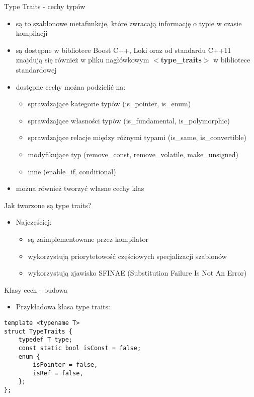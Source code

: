 \documentclass[11pt]{beamer}
\begin{document}
\begin{frame}[fragile]{Type Traits - cechy typów}
    \begin{itemize}
     \item są to szablonowe metafunkcje, które zwracają informację o typie w czasie kompilacji
     \item są dostępne w bibliotece Boost C++, Loki oraz od standardu C++11 znajdują się również w pliku nagłówkowym \textbf{$<$type\_traits$>$} w bibliotece standardowej
     \item dostępne cechy można podzielić na:
      \begin{itemize}
       \item sprawdzające kategorie typów (is\_pointer, is\_enum)
       \item sprawdzające własności typów (is\_fundamental, is\_polymorphic)
       \item sprawdzające relacje między różnymi typami (is\_same, is\_convertible)
       \item modyfikujące typ (remove\_const, remove\_volatile, make\_unsigned)
       \item inne (enable\_if, conditional)
      \end{itemize}
    \item można również tworzyć własne cechy klas
    \end{itemize}
\end{frame}

\begin{frame}[fragile]{Jak tworzone są type traits?}
  \begin{itemize}
 \item Najczęściej:
 \begin{itemize}
 
 \item są zaimplementowane przez kompilator
  \item wykorzystują priorytetowość częściowych specjalizacji szablonów
  \item wykorzystują zjawisko SFINAE (Substitution Failure Is Not An Error)
 \end{itemize}
 \end{itemize}
\end{frame}

\begin{frame}[fragile]{Klasy cech - budowa}
    \begin{itemize}
     \item Przykładowa klasa type traits:
    \end{itemize}
    \begin{lstlisting}[frame=single]
template <typename T>
struct TypeTraits {
    typedef T type;
    const static bool isConst = false;
    enum {
        isPointer = false,
        isRef = false,
    };
};
    \end{lstlisting}
\end{frame}
\end{document}
